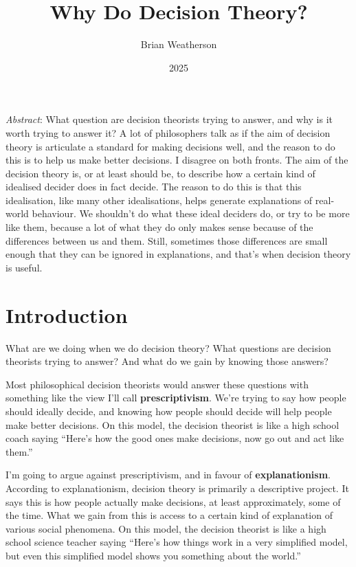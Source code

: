 \documentclass[
  11pt,
  letterpaper,
  DIV=11,
  numbers=noendperiod,
  twoside]{scrartcl}
\title{Why Do Decision Theory?}
\author{Brian Weatherson}
\date{2025}
\renewenvironment{abstract}
 {\vspace{-1.25cm}
 \quotation\small\noindent\emph{Abstract}:}
 {\endquotation}
\begin{document}
\maketitle
\begin{abstract}
What question are decision theorists trying to answer, and why is it
worth trying to answer it? A lot of philosophers talk as if the aim of
decision theory is articulate a standard for making decisions well, and
the reason to do this is to help us make better decisions. I disagree on
both fronts. The aim of the decision theory is, or at least should be,
to describe how a certain kind of idealised decider does in fact decide.
The reason to do this is that this idealisation, like many other
idealisations, helps generate explanations of real-world behaviour. We
shouldn't do what these ideal deciders do, or try to be more like them,
because a lot of what they do only makes sense because of the
differences between us and them. Still, sometimes those differences are
small enough that they can be ignored in explanations, and that's when
decision theory is useful.
\end{abstract}


\section{Introduction}\label{sec-intro}

What are we doing when we do decision theory? What questions are
decision theorists trying to answer? And what do we gain by knowing
those answers?

Most philosophical decision theorists would answer these questions with
something like the view I'll call \textbf{prescriptivism}. We're trying
to say how people should ideally decide, and knowing how people should
decide will help people make better decisions. On this model, the
decision theorist is like a high school coach saying ``Here's how the
good ones make decisions, now go out and act like them.''

I'm going to argue against prescriptivism, and in favour of
\textbf{explanationism}. According to explanationism, decision theory is
primarily a descriptive project. It says this is how people actually
make decisions, at least approximately, some of the time. What we gain
from this is access to a certain kind of explanation of various social
phenomena. On this model, the decision theorist is like a high school
science teacher saying ``Here's how things work in a very simplified
model, but even this simplified model shows you something about the
world.''
\end{document}
